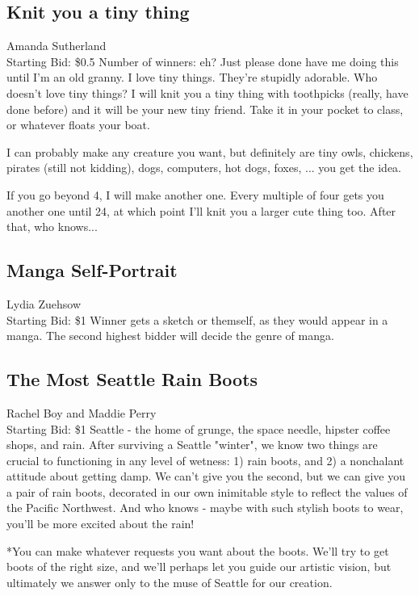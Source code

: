 \documentclass[11pt]{article}
\begin{document}
\subsection{Knit you a tiny thing}
Amanda Sutherland
\\
Starting Bid: \$0.5
\newline
Number of winners: eh? Just please done have me doing this until I'm an old granny. 
\newline
I love tiny things. They're stupidly adorable. Who doesn't love tiny things? I will knit you a tiny thing with toothpicks (really, have done before) and it will be your new tiny friend. Take it in your pocket to class, or whatever floats your boat. 

I can probably make any creature you want, but definitely are tiny owls, chickens, pirates (still not kidding), dogs, computers, hot dogs, foxes, ... you get the idea. 

If you go beyond 4, I will make another one. Every multiple of four gets you another one until 24, at which point I'll knit you a larger cute thing too. After that, who knows...
\subsection{Manga Self-Portrait}
Lydia Zuehsow
\\
Starting Bid: \$1
\newline
Winner gets a sketch or themself, as they would appear in a manga. The second highest bidder will decide the genre of manga.
\subsection{The Most Seattle Rain Boots}
Rachel Boy and Maddie Perry
\\
Starting Bid: \$1
\newline
Seattle - the home of grunge, the space needle, hipster coffee shops, and rain. After surviving a Seattle "winter", we know two things are crucial to functioning in any level of wetness: 1) rain boots, and 2) a nonchalant attitude about getting damp. We can't give you the second, but we can give you a pair of rain boots, decorated in our own inimitable style to reflect the values of the Pacific Northwest. And who knows - maybe with such stylish boots to wear, you'll be more excited about the rain!

*You can make whatever requests you want about the boots. We'll try to get boots of the right size, and we'll perhaps let you guide our artistic vision, but ultimately we answer only to the muse of Seattle for our creation.
\end{document}
